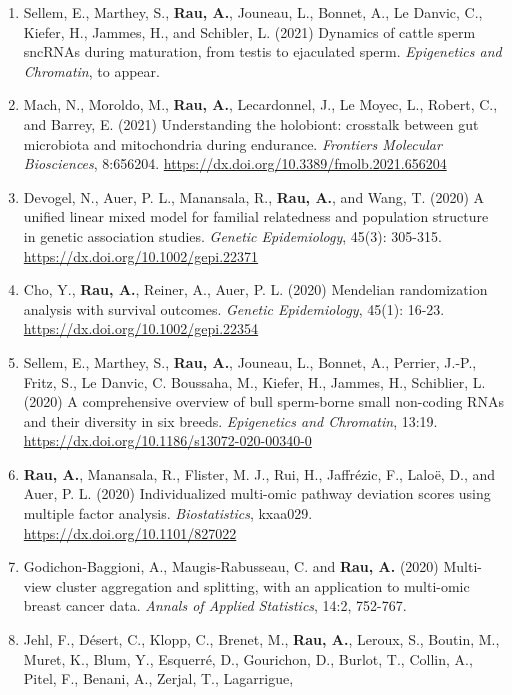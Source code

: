 \documentclass[11pt, a4paper]{awesome-cv}
\providecommand{\tightlist}{%
	\setlength{\itemsep}{0pt}\setlength{\parskip}{0pt}}
\begin{document}
\begin{enumerate}
\def\labelenumi{\arabic{enumi}.}
\tightlist
\item
  Sellem, E., Marthey, S., \textbf{Rau, A.}, Jouneau, L., Bonnet, A., Le
  Danvic, C., Kiefer, H., Jammes, H., and Schibler, L. (2021) Dynamics
  of cattle sperm sncRNAs during maturation, from testis to ejaculated
  sperm. \emph{Epigenetics and Chromatin}, to appear.
\item
  Mach, N., Moroldo, M., \textbf{Rau, A.}, Lecardonnel, J., Le Moyec,
  L., Robert, C., and Barrey, E. (2021) Understanding the holobiont:
  crosstalk between gut microbiota and mitochondria during endurance.
  \emph{Frontiers Molecular Biosciences}, 8:656204.
  \url{https://dx.doi.org/10.3389/fmolb.2021.656204}
\item
  Devogel, N., Auer, P. L., Manansala, R., \textbf{Rau, A.}, and Wang,
  T. (2020) A unified linear mixed model for familial relatedness and
  population structure in genetic association studies. \emph{Genetic
  Epidemiology}, 45(3): 305-315.
  \url{https://dx.doi.org/10.1002/gepi.22371}
\item
  Cho, Y., \textbf{Rau, A.}, Reiner, A., Auer, P. L. (2020) Mendelian
  randomization analysis with survival outcomes. \emph{Genetic
  Epidemiology}, 45(1): 16-23.
  \url{https://dx.doi.org/10.1002/gepi.22354}
\item
  Sellem, E., Marthey, S., \textbf{Rau, A.}, Jouneau, L., Bonnet, A.,
  Perrier, J.-P., Fritz, S., Le Danvic, C. Boussaha, M., Kiefer, H.,
  Jammes, H., Schiblier, L. (2020) A comprehensive overview of bull
  sperm-borne small non-coding RNAs and their diversity in six breeds.
  \emph{Epigenetics and Chromatin}, 13:19.
  \url{https://dx.doi.org/10.1186/s13072-020-00340-0}
\item
  \textbf{Rau, A.}, Manansala, R., Flister, M. J., Rui, H., Jaffrézic,
  F., Laloë, D., and Auer, P. L. (2020) Individualized multi-omic
  pathway deviation scores using multiple factor analysis.
  \emph{Biostatistics}, kxaa029. \url{https://dx.doi.org/10.1101/827022}
\item
  Godichon-Baggioni, A., Maugis-Rabusseau, C. and \textbf{Rau, A.}
  (2020) Multi-view cluster aggregation and splitting, with an
  application to multi-omic breast cancer data. \emph{Annals of Applied
  Statistics}, 14:2, 752-767.
\item
  Jehl, F., Désert, C., Klopp, C., Brenet, M., \textbf{Rau, A.}, Leroux,
  S., Boutin, M., Muret, K., Blum, Y., Esquerré, D., Gourichon, D.,
  Burlot, T., Collin, A., Pitel, F., Benani, A., Zerjal, T., Lagarrigue,

\end{enumerate}
\end{document}
